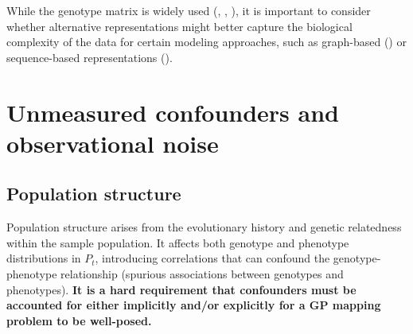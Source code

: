 \documentclass[12pt]{article}
\begin{document}
While the genotype matrix is widely used (\cite{ma2020increased}, \cite{macesic2020predicting}, \cite{burgaya2023bacterial}), it is important to consider whether alternative representations might better capture the biological complexity of the data for certain modeling approaches, such as graph-based (\cite{yang2021end}) or sequence-based representations (\cite{wiatrak2024sequence}).



\section{Unmeasured confounders and observational noise}




\subsection{Population structure}

Population structure arises from the evolutionary history and genetic relatedness within the sample population. It affects both genotype and phenotype distributions in $P_t$, introducing correlations that can confound the genotype-phenotype relationship (spurious associations between genotypes and phenotypes). \textbf{It is a hard requirement that confounders must be accounted for either implicitly and/or explicitly for a GP mapping problem to be well-posed.} 
\end{document}
